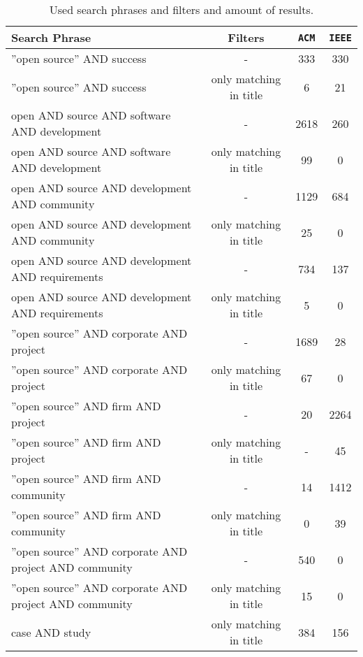 \documentclass[11pt, oneside]{article}   	%
\begin{document}
\begin{table}[!h]
	\begin{tabular}{ | l | c | c | c |}
		\hline
		\textbf{Search Phrase} 								& \textbf{Filters}			& \textbf{\texttt{ACM}} 	& \textbf{\texttt{IEEE}}	\\\hline
		''open source'' AND success			 				& - 						& 333 				& 330				\\\hline
		''open source'' AND success	 						& only matching in title		& 6 					& 21					\\\hline
		open AND source AND software AND development	 		& - 						& 2618 				& 260				\\\hline
		open AND source AND software AND development	 		& only matching in title		& 99 					& 0					\\\hline
		open AND source AND development AND community	 	& - 						& 1129 				& 684				\\\hline
		open AND source AND development AND community	 	& only matching in title		& 25 					& 0					\\\hline
		open AND source AND development AND requirements	 	& - 						& 734 				& 137				\\\hline
		open AND source AND development AND requirements	 	& only matching in title		& 5 					& 0					\\\hline		
		''open source'' AND corporate AND project		 		& - 						& 1689 				& 28					\\\hline
		''open source'' AND corporate AND project		 		& only matching in title		& 67 					& 0					\\\hline
		''open source'' AND firm AND project				 		& - 						& 20 					& 2264				\\\hline
		''open source'' AND firm AND project				 		& only matching in title		& -					& 45					\\\hline
		''open source'' AND firm AND community				 	& - 						& 14 					& 1412				\\\hline
		''open source'' AND firm AND community				 	& only matching in title		& 0 					& 39					\\\hline
		''open source'' AND corporate AND project AND community	& - 						& 540 				& 0					\\\hline
		''open source'' AND corporate AND project AND community	& only matching in title		& 15 					& 0					\\\hline
		case AND study\footnotemark							& only matching in title		& 384 				& 156				\\\hline
	\end{tabular}
	\caption{Used search phrases and filters and amount of results.}
	\label{tab:results}
\end{table}
\end{document}
